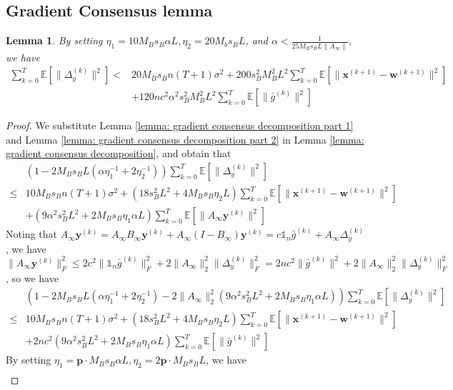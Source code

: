 \documentclass{article}
\newtheorem{lemma}[thm]{Lemma}
\newcommand{\vw}{{\mathbf{w}}}
\newcommand{\vx}{{\mathbf{x}}}
\newcommand{\vy}{{\mathbf{y}}}
\newcommand{\EE}[1]{\mathbb{E}\left[#1\right]}
\newcommand{\norm}[1]{\| #1 \|}
\newcommand{\one}{\mathds{1}_n}
\begin{document}
\subsection{Gradient Consensus lemma}
\begin{lemma}\label{Basic: Gradient Consensus lemma}
By setting $\eta_1=10M_Bs_B\alpha L,\eta_2=20M_bs_BL$, and $\alpha < \frac{1}{25M_Bs_BL\norm{A_{\infty}}}$, we have
  \begin{align*}
    \sum_{k=0}^T \EE{\norm{\Delta_y^{(k)}}^2}
  <&20M_Bs_Bn (T+1)\sigma^2+200s_B^2M_B^2L^2\sum_{k=0}^T\EE{\norm{\vx^{(k+1)}-\vw^{(k+1)}}^2}\\&+120nc^2\alpha^2s_B^2M_B^2L^2 \sum_{k=0}^T \EE{\norm{\bar{g}^{(k)}}^2}
\end{align*}
\end{lemma}
\begin{proof}
We substitute Lemma \ref{lemma: gradient consensus decomposition part 1} and Lemma \ref{lemma: gradient consensus decomposition part 2} in Lemma \ref{lemma: gradient consensus decomposition}, and obtain that 
\begin{align*}
  &\left(1-2M_Bs_BL(\alpha\eta_1^{-1}+2\eta_2^{-1})\right)\sum_{k=0}^T \EE{\norm{\Delta_y^{(k)}}^2}\\ 
  \leq &10M_Bs_Bn(T+1)\sigma^2+(18s_B^2L^2+4M_Bs_B\eta_2 L)\sum_{k=0}^T\EE{\norm{\vx^{(k+1)}-\vw^{(k+1)}}^2}\\&+(9\alpha^2s_B^2L^2+2M_Bs_B\eta_1\alpha L) \sum_{k=0}^T \EE{\norm{A_{\infty}\vy^{(k)}}^2}
\end{align*}
Noting that $A_{\infty}\vy^{(k)}=A_{\infty}B_{\infty}\vy^{(k)}+ A_{\infty}(I-B_{\infty})\vy^{(k)}=c\one\bar{g}^{(k)}+A_{\infty}\Delta_{y}^{(k)}$, we have $\norm{A_{\infty }\vy^{(k)}}^2_F\leq 2c^2 \norm{\one\bar{g}^{(k)}}_F^2+2 \norm{A_{\infty}}_2^2\norm{\Delta_y^{(k)}}_F^2= 2 nc^2 \norm{\bar{g}^{(k)}}^2+ 2\norm{A_{\infty}}_2^2\norm{\Delta_y^{(k)}}_F^2$, so we have
\begin{align*}
  &\left(1-2M_Bs_BL(\alpha\eta_1^{-1}+2\eta_2^{-1})-2\norm{A_{\infty}}_2^2(9\alpha^2s_B^2L^2+2M_Bs_B\eta_1\alpha L) \right)\sum_{k=0}^T \EE{\norm{\Delta_y^{(k)}}^2}\\ 
  \leq &10M_Bs_Bn (T+1)\sigma^2+(18s_B^2L^2+4M_Bs_B\eta_2 L)\sum_{k=0}^T\EE{\norm{\vx^{(k+1)}-\vw^{(k+1)}}^2}\\&+2nc^2(9\alpha^2s_B^2L^2+2M_Bs_B\eta_1\alpha L) \sum_{k=0}^T \EE{\norm{\bar{g}^{(k)}}^2}
\end{align*}
By setting $\eta_1=\mathbf{p}\cdot M_Bs_B\alpha L,\eta_2=2\mathbf{p}\cdot M_Bs_BL$, we have
\begin{align*}

\end{align*}
\end{proof}
\end{document}
